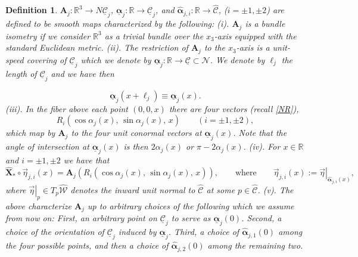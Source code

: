 \documentclass[12pt,namelimits,sumlimits]{amsart}
\newtheorem{definition}[theorem]{Definition}
\theoremstyle{remark}
\numberwithin{equation}{section}
\begin{document}
\addtocounter{equation}{1}
\begin{definition}
\label{DAj}
${\boldsymbol{A}}_j:{\mathbb{R}}^3\to N{\underline{{\mathcal{C}}}}_j$,
${\underline{\boldsymbol{\alpha}}}_j:{\mathbb{R}}\to{\underline{{\mathcal{C}}}}_j$,
and
${\widehat{\boldsymbol{\alpha}}}_{j,i}:{\mathbb{R}}\to{{\widehat{{\mathcal{C}}}}}$,
(${{i=\pm1,\pm2}}$)
are defined to be smooth maps 
characterized by the following:
\newline
(i).
${\boldsymbol{A}}_j$ is a bundle isometry if we consider ${\mathbb{R}}^3$ as a trivial bundle over the $x_3$-axis equipped with the
standard Euclidean metric.
\newline
(ii).
The restriction of ${\boldsymbol{A}}_j$ to the $x_3$-axis is a unit-speed covering of ${\underline{{\mathcal{C}}}}_j$
which we denote by ${\underline{\boldsymbol{\alpha}}}_j:{\mathbb{R}}\to{\underline{{\mathcal{C}}}}\subset{{\mathcal{N}}}$.
We denote by $\ell_j$ the length of ${\underline{{\mathcal{C}}}}_j$ and we have then
\addtocounter{theorem}{1}
\begin{equation}
\label{Elk}
{\underline{\boldsymbol{\alpha}}}_j(x+\ell_j)  \equiv   {\underline{\boldsymbol{\alpha}}}_j(x).
\end{equation}
(iii).
In the fiber above each point $(0,0,x)$ there are four vectors
(recall \ref{NR}),
$$
R_i(\cos\alpha_j(x),\,\sin\alpha_j(x),\,x)
\qquad
({{i=\pm1,\pm2}}),
$$
which map by ${\boldsymbol{A}}_j$ to the four unit conormal vectors at ${\underline{\boldsymbol{\alpha}}}_j(x)$.
Note that the angle of intersection at ${\underline{\boldsymbol{\alpha}}}_j(x)$ is then $2\alpha_j(x)$ or $\pi-2\alpha_j(x)$.
\newline
(iv).
For $x\in{\mathbb{R}}$ and ${{i=\pm1,\pm2}}$ we have that
$$
{\widehat{\boldsymbol{X}}}_*\circ{\vec{\eta}}_{{j,i}}(x)
=
{\boldsymbol{A}}_j(  R_i(\cos\alpha_j(x),\,\sin\alpha_j(x),\,x)  ),
\qquad
\text{where}
\qquad
{\vec{\eta}}_{{j,i}}(x):=
\left.{\vec{\eta}}\right|_{{\widehat{\boldsymbol{\alpha}}}_{{j,i}}(x)} ,
$$
where $\left.{\vec{\eta}}\right|_p \in T_p{{\widehat{{\mathcal{W}}}}}$ denotes the inward unit normal to ${{\widehat{{\mathcal{C}}}}}$ at some $p\in{{\widehat{{\mathcal{C}}}}}$.
\newline
(v).
The above characterize ${\boldsymbol{A}}_j$ up to arbitrary choices of the following which we assume from now on:
First, an arbitrary point on
${\underline{{\mathcal{C}}}}_j$ to serve as ${\underline{\boldsymbol{\alpha}}}_j(0)$.
Second, a choice of the orientation of ${\underline{{\mathcal{C}}}}_j$ induced by ${\underline{\boldsymbol{\alpha}}}_j$.
Third, 
a choice of ${\widehat{\boldsymbol{\alpha}}}_{j,1}(0)$ among the four possible points,
and then a choice of ${\widehat{\boldsymbol{\alpha}}}_{j,2}(0)$ among the remaining two.
\end{definition}
\end{document}
